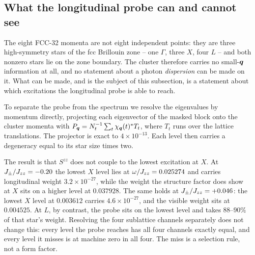 %

\subsection{What the longitudinal probe can and cannot see}
\label{sec:parity}

The eight FCC-32 momenta are not eight independent points: they are three
high-symmetry stars of the fcc Brillouin zone -- one $\Gamma$, three $X$, four
$L$ -- and both nonzero stars lie on the zone boundary.  The cluster therefore
carries no small-$\bm q$ information at all, and no statement about a photon
\emph{dispersion} can be made on it.  What can be made, and is the subject of
this subsection, is a statement about which excitations the longitudinal probe
is able to reach.

To separate the probe from the spectrum we resolve the eigenvalues by momentum
directly, projecting each eigenvector of the masked block onto the cluster
momenta with $P_{\bm q}=N_t^{-1}\sum_t \chi_{\bm q}(t)^{*}T_t$, where $T_t$ runs over
the lattice translations.  The projector is exact to $4\times10^{-13}$.  Each
level then carries a degeneracy equal to its star size times two.

The result is that $S^{zz}$ does not couple to the lowest excitation at $X$.
At $J_{\pm}/J_{zz}=-0.20$ the lowest $X$ level lies at $\omega/J_{zz}=0.025274$ and
carries longitudinal weight $3.2\times10^{-27}$, while the weight the structure
factor does show at $X$ sits on a higher level at $0.037928$.  The same holds
at $J_{\pm}/J_{zz}=+0.046$: the lowest $X$ level at $0.003612$ carries
$4.6\times10^{-27}$, and the visible weight sits at $0.004525$.  At $L$, by
contrast, the probe sits on the lowest level and takes $88$--$90\%$ of that
star's weight.  Resolving the four sublattice channels separately does not
change this: every level the probe reaches has all four channels exactly equal,
and every level it misses is at machine zero in all four.  The miss is a
selection rule, not a form factor.

